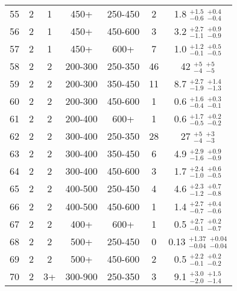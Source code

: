 \begin{table}[tbp]
{\begin{tabular}{ccccc  cc}
        55 &          2 &          1 &       450+ &    250-450 &          2 &   1.8 $^{ +1.5} _{ -0.6}$ $^{ +0.4} _{ -0.4}$ \\
        56 &          2 &          1 &       450+ &    450-600 &          3 &   3.2 $^{ +2.7} _{ -1.1}$ $^{ +0.9} _{ -0.9}$ \\
        57 &          2 &          1 &       450+ &       600+ &          7 &   1.0 $^{ +1.2} _{ -0.1}$ $^{ +0.5} _{ -0.5}$ \\
 \hline
        58 &          2 &          2 &    200-300 &    250-350 &         46 &    42 $^{   +5} _{   -4}$ $^{   +5} _{   -5}$ \\
        59 &          2 &          2 &    200-300 &    350-450 &         11 &   8.7 $^{ +2.7} _{ -1.9}$ $^{ +1.4} _{ -1.3}$ \\
        60 &          2 &          2 &    200-300 &    450-600 &          1 &   0.6 $^{ +1.6} _{ -0.4}$ $^{ +0.3} _{ -0.1}$ \\
        61 &          2 &          2 &    200-400 &       600+ &          1 &   0.6 $^{ +1.7} _{ -0.5}$ $^{ +0.2} _{ -0.2}$ \\
        62 &          2 &          2 &    300-400 &    250-350 &         28 &    27 $^{   +5} _{   -4}$ $^{   +3} _{   -3}$ \\
        63 &          2 &          2 &    300-400 &    350-450 &          6 &   4.9 $^{ +2.9} _{ -1.6}$ $^{ +0.9} _{ -0.9}$ \\
        64 &          2 &          2 &    300-400 &    450-600 &          3 &   1.7 $^{ +2.4} _{ -1.0}$ $^{ +0.6} _{ -0.5}$ \\
        65 &          2 &          2 &    400-500 &    250-450 &          4 &   4.6 $^{ +2.3} _{ -1.2}$ $^{ +0.7} _{ -0.8}$ \\
        66 &          2 &          2 &    400-500 &    450-600 &          1 &   1.4 $^{ +2.7} _{ -0.7}$ $^{ +0.4} _{ -0.6}$ \\
        67 &          2 &          2 &       400+ &       600+ &          1 &   0.5 $^{ +2.7} _{ -0.1}$ $^{ +0.2} _{ -0.7}$ \\
        68 &          2 &          2 &       500+ &    250-450 &          0 &  0.13 $^{+1.37} _{-0.04}$ $^{+0.04} _{-0.04}$ \\
        69 &          2 &          2 &       500+ &    450-600 &          2 &   0.5 $^{ +2.2} _{ -0.1}$ $^{ +0.2} _{ -0.2}$ \\
 \hline
        70 &          2 &         3+ &    300-900 &    250-350 &          3 &   9.1 $^{ +3.0} _{ -2.0}$ $^{ +1.5} _{ -1.4}$ \\

\end{tabular}}
\end{table}
